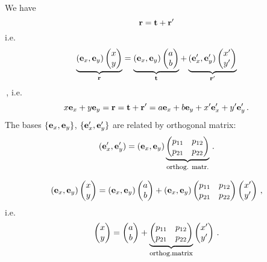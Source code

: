 \documentclass[12pt]{article}
\numberwithin{equation}{section}
\begin{document}
We have
  \begin{equation*}
  {\bf r}={\bf t}+{\bf r}'  
  \end{equation*}
i.e.
 \begin{equation*}
      \underbrace
            {
  ({\bf e}_x,{\bf e}_y)
  \begin{pmatrix}
         x \cr
        y\cr
   \end{pmatrix}
     }_{{\bf r}}
            =
        \underbrace
         {
  ({\bf e}_x,{\bf e}_y)
      \begin{pmatrix}
         a \cr
        b\cr
   \end{pmatrix}
          }_{\bf t}
          +
      \underbrace
         {
  ({\bf e}'_x,{\bf e}'_y)
      \begin{pmatrix}
         x' \cr
        y'\cr
   \end{pmatrix}
          }_{\bf {\bf r}'}
\end{equation*}\,,
i.e.
  \begin{equation*}
  x{\bf e}_x+y{\bf e}_y={\bf r}={\bf t}+{\bf r}'=a{\bf e}_x+b{\bf e}_y+x'{\bf e}'_x+y'{\bf e}'_y\,.
  \end{equation*}
The bases $\{{\bf e}_x,{\bf e}_y\}$, $\{{\bf e}'_x,{\bf e}'_y\}$
are related by orthogonal matrix:
      \begin{equation}\label{matrixorthogonal1}
  ({\bf e}'_x,{\bf e}'_y)=({\bf e}_x,{\bf e}_y)
\underbrace
        {
     \begin{pmatrix}
    p_{11} &p_{12}\cr
    p_{21} &p_{22}\cr
\end{pmatrix}
     }_{\hbox {\footnotesize orthog. matr.}}\,.
    \end{equation}

 \begin{equation*}
  ({\bf e}_x,{\bf e}_y)
  \begin{pmatrix}
         x \cr
        y\cr
   \end{pmatrix}
=  ({\bf e}_x,{\bf e}_y)
  \begin{pmatrix}
         a \cr
        b\cr
   \end{pmatrix}
              +  
 ({\bf e}_x,{\bf e}_y)
      \begin{pmatrix}
    p_{11} &p_{12}\cr
    p_{21} &p_{22}\cr
         \end{pmatrix}
           \begin{pmatrix}
         x'\cr
        y'\cr
   \end{pmatrix}\,,
\end{equation*}
i.e. \begin{equation*}
  \begin{pmatrix}
         x \cr
        y\cr
   \end{pmatrix}
         =
  \begin{pmatrix}
         a \cr
        b\cr
   \end{pmatrix}
              +  
         \underbrace
         {
      \begin{pmatrix}
    p_{11} &p_{12}\cr
    p_{21} &p_{22}\cr
         \end{pmatrix}
         }_{\hbox 
    {\footnotesize orthog.matrix}}
           \begin{pmatrix}
         x'\cr
        y'\cr
   \end{pmatrix}\,.
\end{equation*}
 
\end{document}
